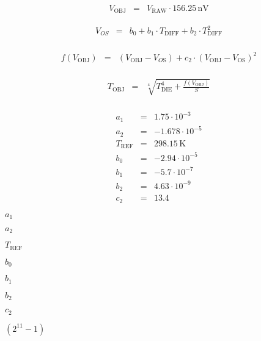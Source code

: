 \documentclass{article}
\begin{document}
\begin{eqnarray*} V_{\mathrm{OBJ}} &=& V_{\mathrm{RAW}} \cdot 156.25\,\mathrm{nV} \end{eqnarray*}
\pagebreak

\begin{eqnarray*} V_{OS} &=& b_0 + b_1 \cdot T_{\mathrm{DIFF}} + b_2 \cdot T_{\mathrm{DIFF}}^2 \\ \end{eqnarray*}
\pagebreak

\begin{eqnarray*} f(V_{\mathrm{OBJ}}) &=& (V_{\mathrm{OBJ}} - V_{O\mathrm{S}}) + c_2 \cdot (V_{\mathrm{OBJ}} - V_{\mathrm{OS}})^2 \\ \end{eqnarray*}
\pagebreak

\begin{eqnarray*} T_{\mathrm{OBJ}} &=& \sqrt[4]{T_{\mathrm{DIE}}^4 + \frac{f(V_{\mathrm{OBJ}})}{S}} \\ \end{eqnarray*}
\pagebreak

\begin{eqnarray*} a_{\mathrm{1}} &=& 1.75 \cdot 10^{-3} \\ a_{\mathrm{2}} &=& -1.678 \cdot 10^{-5} \\ T_{\mathrm{REF}} &=& 298.15\,\mathrm{K} \\ b_{\mathrm{0}} &=& -2.94 \cdot 10^{-5} \\ b_{\mathrm{1}} &=& -5.7 \cdot 10^{-7} \\ b_{\mathrm{2}} &=& 4.63 \cdot 10^{-9} \\ c_{\mathrm{2}} &=& 13.4 \end{eqnarray*}
\pagebreak

$a_{\mathrm{1}}$
\pagebreak

$a_{\mathrm{2}}$
\pagebreak

$T_{\mathrm{REF}}$
\pagebreak

$b_{\mathrm{0}}$
\pagebreak

$b_{\mathrm{1}}$
\pagebreak

$b_{\mathrm{2}}$
\pagebreak

$c_{\mathrm{2}}$
\pagebreak

$ (2^{11} - 1) $
\pagebreak
\end{document}
